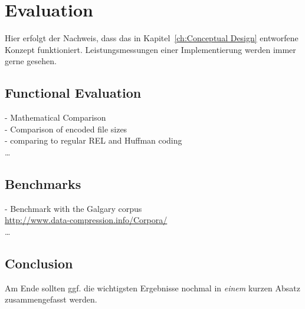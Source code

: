 
\chapter{Evaluation}
\label{ch:Evaluation}
Hier erfolgt der Nachweis, dass das in Kapitel~\ref{ch:Conceptual Design}
entworfene Konzept funktioniert. 
Leistungsmessungen einer Implementierung werden immer gerne gesehen.

\section{Functional Evaluation}
\label{ch:Evaluation:sec:Functional Evaluation}
- Mathematical Comparison\\
- Comparison of encoded file sizes\\
- comparing to regular REL and Huffman coding\\
\ldots

\section{Benchmarks}
\label{ch:Evaluation:sec:Benchmarks}
- Benchmark with the Galgary corpus\\
\url{http://www.data-compression.info/Corpora/} \\
\ldots

\section{Conclusion}
\label{ch:Evaluation:sec:Conclusion}

Am Ende sollten ggf. die wichtigsten Ergebnisse nochmal in \emph{einem} kurzen Absatz zusammengefasst werden.

